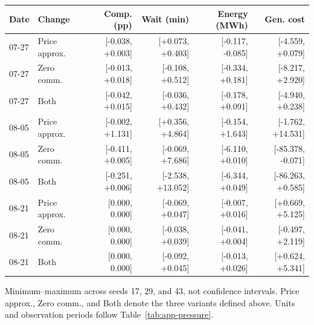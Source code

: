\par\medskip\Needspace{187pt}
\noindent\begin{minipage}{\textwidth}
\centering\footnotesize\setlength{\tabcolsep}{3pt}\renewcommand{\arraystretch}{1.13}
\label{tab:app-ranges}
\begin{tabular*}{\textwidth}{@{\extracolsep{\fill}}llrrrr@{}}
\toprule
Date & Change & Comp. (pp) & Wait (min) & Energy (MWh) & Gen. cost\\
\midrule
07-27 & Price approx. & [-0.038, +0.003] & [+0.073, +0.403] & [-0.117, -0.085] & [-4.559, +0.079]\\
07-27 & Zero comm. & [-0.013, +0.018] & [-0.108, +0.512] & [-0.334, +0.181] & [-8.217, +2.920]\\
07-27 & Both & [-0.042, +0.015] & [-0.036, +0.432] & [-0.178, +0.091] & [-4.940, +0.238]\\
08-05 & Price approx. & [-0.002, +1.131] & [+0.356, +4.864] & [-0.154, +1.643] & [-1.762, +14.531]\\
08-05 & Zero comm. & [-0.411, +0.005] & [-0.069, +7.686] & [-6.110, +0.010] & [-85.378, -0.071]\\
08-05 & Both & [-0.251, +0.006] & [-2.538, +13.052] & [-6.344, +0.049] & [-86.263, +0.585]\\
08-21 & Price approx. & [0.000, 0.000] & [-0.069, +0.047] & [-0.007, +0.016] & [+0.669, +5.125]\\
08-21 & Zero comm. & [0.000, 0.000] & [-0.038, +0.039] & [-0.041, +0.004] & [-0.497, +2.119]\\
08-21 & Both & [0.000, 0.000] & [-0.092, +0.045] & [-0.013, +0.026] & [+0.624, +5.341]\\
\bottomrule\end{tabular*}
\par\smallskip\raggedright Minimum--maximum across seeds 17, 29, and 43, not confidence intervals. Price approx., Zero comm., and Both denote the three variants defined above. Units and observation periods follow Table~\ref{tab:app-pressure}.
\end{minipage}\par\medskip
